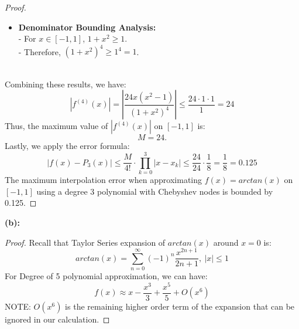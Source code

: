 \documentclass{article}
\begin{document}
\begin{proof}
\begin{itemize}
        \item \textbf{Denominator Bounding Analysis:} 
        \\
        - For \( x \in [-1, 1] \), \( 1 + x^2 \geq 1 \).
        \\
        - Therefore, \( (1 + x^2)^4 \geq 1^4 = 1 \).
    \end{itemize}
    \\
    Combining these results, we have:
    \[
        |f^{(4)}(x)| = \left| \frac{24x(x^2 - 1)}{(1 + x^2)^4} \right| \leq \frac{24 \cdot 1 \cdot 1}{1} = 24
    \]
    Thus, the maximum value of \( |f^{(4)}(x)| \) on \( [-1, 1] \) is:
    \[
        M = 24.
    \]
    Lastly, we apply the error formula:
    \[ |f(x) - P_3(x)| \leq \frac{M}{4!} \cdot \prod_{k=0}^{3}|x - x_k| \leq \frac{24}{24} \cdot \frac{1}{8} = \frac{1}{8} = 0.125 \]
    The maximum interpolation error when approximating $f(x) = arctan(x)$ on $[-1,1]$ using a degree 3 polynomial with Chebyshev nodes is bounded by 0.125.
\end{proof}

\textbf{(b): }
\\
\begin{proof}
    Recall that Taylor Series expansion of $arctan(x)$ around $x = 0$ is:
    \[ arctan(x) = \sum_{n = 0}^{\infty} (-1)^n \frac{x^{2n + 1}}{2n + 1}, \ |x| \leq 1 \]
    For Degree of 5 polynomial approximation, we can have:
    \[ f(x) \approx x - \frac{x^3}{3} + \frac{x^5}{5} + O(x^6) \]
    NOTE: $O(x^6)$ is the remaining higher order term of the expansion that can be ignored in our calculation.
\end{proof}
\end{document}
